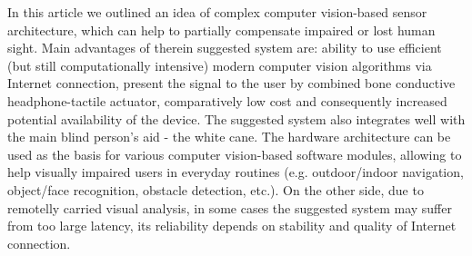 \documentclass[10pt,conference,compsocconf]{IEEEtran}
\begin{document}
In this article we outlined an idea of complex computer vision-based sensor architecture, which can help to partially compensate impaired or lost human sight. Main advantages of therein suggested system are: ability to use efficient (but still computationally intensive) modern computer vision algorithms via Internet connection, present the signal to the user by combined bone conductive headphone-tactile actuator, comparatively low cost and consequently increased potential availability of the device. The suggested system also integrates well with the main blind person's aid - the white cane. The hardware architecture can be used as the basis for various computer vision-based software modules, allowing to help visually impaired users in everyday routines (e.g. outdoor/indoor navigation, object/face recognition, obstacle detection, etc.). On the other side, due to remotelly carried visual analysis, in some cases the suggested system may suffer from too large latency, its reliability depends on stability and quality of Internet connection. 













\end{document}
